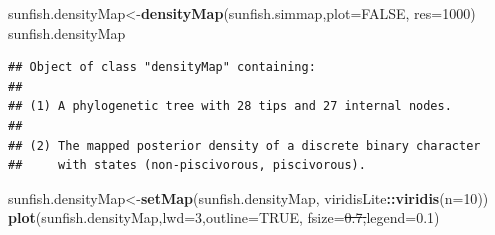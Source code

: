 \documentclass[fleqn,10pt,lineno]{wlpeerj}
\newenvironment{Shaded}{\begin{snugshade}}{\end{snugshade}}
\newcommand{\AttributeTok}[1]{\textcolor[rgb]{0.13,0.29,0.53}{#1}}
\newcommand{\ConstantTok}[1]{\textcolor[rgb]{0.56,0.35,0.01}{#1}}
\newcommand{\DecValTok}[1]{\textcolor[rgb]{0.00,0.00,0.81}{#1}}
\newcommand{\FloatTok}[1]{\textcolor[rgb]{0.00,0.00,0.81}{#1}}
\newcommand{\FunctionTok}[1]{\textcolor[rgb]{0.13,0.29,0.53}{\textbf{#1}}}
\newcommand{\NormalTok}[1]{#1}
\newcommand{\OtherTok}[1]{\textcolor[rgb]{0.56,0.35,0.01}{#1}}
\newcommand{\SpecialCharTok}[1]{\textcolor[rgb]{0.81,0.36,0.00}{\textbf{#1}}}
\providecommand{\DIFaddtex}[1]{{\protect\color{blue}\uwave{#1}}} %
\providecommand{\DIFdeltex}[1]{{\protect\color{red}\sout{#1}}}                      %
\providecommand{\DIFaddbegin}{} %
\providecommand{\DIFaddend}{} %
\providecommand{\DIFdelbegin}{} %
\providecommand{\DIFdelend}{} %
\providecommand{\DIFadd}[1]{\texorpdfstring{\DIFaddtex{#1}}{#1}} %
\providecommand{\DIFdel}[1]{\texorpdfstring{\DIFdeltex{#1}}{}} %
\newcommand{\DIFscaledelfig}{0.5}
\newlength{\DIFdelgraphicswidth} %
\newlength{\DIFdelgraphicsheight} %
\newcommand{\DIFaddincludegraphics}[2][]{{\color{blue}\fbox{\DIFOincludegraphics[#1]{#2}}}} %
\newcommand{\DIFdelincludegraphics}[2][]{%
\sbox{\DIFdelgraphicsbox}{\DIFOincludegraphics[#1]{#2}}%
\settoboxwidth{\DIFdelgraphicswidth}{\DIFdelgraphicsbox} %
\settoboxtotalheight{\DIFdelgraphicsheight}{\DIFdelgraphicsbox} %
\scalebox{\DIFscaledelfig}{%
\parbox[b]{\DIFdelgraphicswidth}{\usebox{\DIFdelgraphicsbox}\\[-\baselineskip] \rule{\DIFdelgraphicswidth}{0em}}\llap{\resizebox{\DIFdelgraphicswidth}{\DIFdelgraphicsheight}{%
\setlength{\unitlength}{\DIFdelgraphicswidth}%
\begin{picture}(1,1)%
\thicklines\linethickness{2pt} %
{\color[rgb]{1,0,0}\put(0,0){\framebox(1,1){}}}%
{\color[rgb]{1,0,0}\put(0,0){\line( 1,1){1}}}%
{\color[rgb]{1,0,0}\put(0,1){\line(1,-1){1}}}%
\end{picture}%
}\hspace*{3pt}}} %
} %
\DeclareRobustCommand{\DIFaddbegin}{\DIFOaddbegin \let\includegraphics\DIFaddincludegraphics} %
\DeclareRobustCommand{\DIFaddend}{\DIFOaddend \let\includegraphics\DIFOincludegraphics} %
\DeclareRobustCommand{\DIFdelbegin}{\DIFOdelbegin \let\includegraphics\DIFdelincludegraphics} %
\DeclareRobustCommand{\DIFdelend}{\DIFOaddend \let\includegraphics\DIFOincludegraphics} %
\begin{document}
\begin{Shaded}
\begin{Highlighting}[]
\NormalTok{sunfish.densityMap}\OtherTok{\textless{}{-}}\FunctionTok{densityMap}\NormalTok{(sunfish.simmap,}\AttributeTok{plot=}\ConstantTok{FALSE}\NormalTok{,}
  \AttributeTok{res=}\DecValTok{1000}\NormalTok{)}
\NormalTok{sunfish.densityMap}
\end{Highlighting}
\end{Shaded}

\begin{verbatim}
## Object of class "densityMap" containing:
## 
## (1) A phylogenetic tree with 28 tips and 27 internal nodes.
## 
## (2) The mapped posterior density of a discrete binary character
##     with states (non-piscivorous, piscivorous).
\end{verbatim}

\begin{Shaded}
\begin{Highlighting}[]
\NormalTok{sunfish.densityMap}\OtherTok{\textless{}{-}}\FunctionTok{setMap}\NormalTok{(sunfish.densityMap,}
\NormalTok{  viridisLite}\SpecialCharTok{::}\FunctionTok{viridis}\NormalTok{(}\AttributeTok{n=}\DecValTok{10}\NormalTok{))}
\FunctionTok{plot}\NormalTok{(sunfish.densityMap,}\AttributeTok{lwd=}\DecValTok{3}\NormalTok{,}\AttributeTok{outline=}\ConstantTok{TRUE}\NormalTok{,}
  \AttributeTok{fsize=}\DIFdelbegin \DIFdel{\FloatTok{0.7}\NormalTok{,}}\DIFdelend \DIFaddbegin \DIFadd{\FunctionTok{c}\NormalTok{(}\FloatTok{0.6}\NormalTok{,}\FloatTok{0.7}\NormalTok{),}}\DIFaddend \AttributeTok{legend=}\FloatTok{0.1}\NormalTok{)}
\end{Highlighting}
\end{Shaded}
\end{document}
